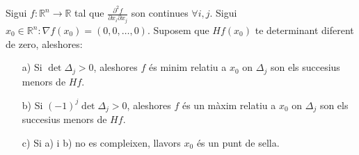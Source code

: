 \documentclass[../main.tex]{subfiles}
\begin{document}
    \begin{teorema}
        Sigui $f: \mathbb{R}^n \to \mathbb{R}$ tal que $\frac{\partial^2f}{\partial x_i \partial x_j}$
        son continues $ \forall i,j$. Sigui $x_0 \in \mathbb{R}^n: \nabla f\left(x_0\right) = \left(0, 0, \dots, 0\right)$.
        Suposem que $Hf\left(x_0\right)$ te determinant diferent de zero, aleshores:
        \begin{itemize}
            \item[a)] Si $\det{\Delta_j} > 0$, aleshores $f$ és minim relatiu a $x_0$ on $\Delta_j$
            son els succesius menors de $Hf$.
            \item[b)] Si $(-1)^j\det{\Delta_j} > 0$, aleshores $f$ és un màxim relatiu a $x_0$ on $\Delta_j$
            son els succesius menors de $Hf$.
            \item[c)] Si a) i b) no es compleixen, llavors $x_0$ és un punt de sella.
        \end{itemize} 
    \end{teorema}
\end{document}
